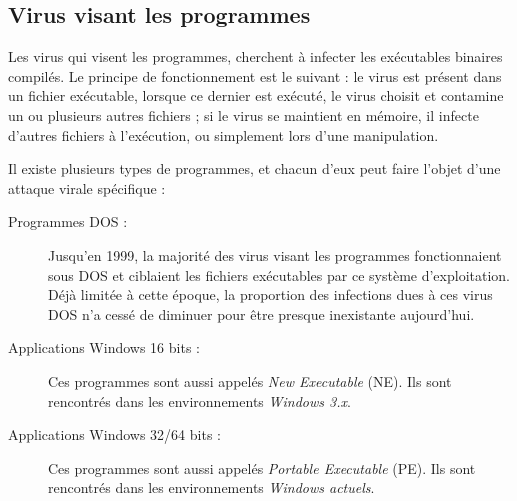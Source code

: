     \subsection{Virus visant les programmes}
    Les virus qui visent les programmes, cherchent à infecter les exécutables binaires compilés. 
    Le principe de fonctionnement est le suivant : le virus est présent dans un fichier exécutable, lorsque 
    ce dernier est exécuté, le virus choisit et contamine un ou plusieurs autres fichiers ; si le virus se maintient
    en mémoire, il infecte d'autres fichiers à l'exécution, ou simplement lors d'une manipulation. 
    \cite{virus_informatique_article}%

    Il existe plusieurs types de programmes, et chacun d'eux peut faire l'objet d'une attaque virale spécifique 
    \cite{virus_informatique_article} : %
    \begin{description}
        \item[Programmes DOS :] Jusqu’en 1999, la majorité des virus visant les programmes fonctionnaient sous 
            DOS et ciblaient les fichiers exécutables par ce système d'exploitation. 
            Déjà limitée à cette époque, la proportion des infections dues à ces virus DOS n’a cessé 
            de diminuer pour être presque inexistante aujourd’hui. %
        \item[Applications Windows 16 bits :] Ces programmes sont aussi appelés \emph{New Executable} (NE).
            Ils sont rencontrés dans les environnements \emph{Windows 3.x}. %

        \item[Applications Windows 32/64 bits :] Ces programmes sont aussi appelés \emph{Portable Executable}
            (PE). Ils sont rencontrés dans les environnements \emph{Windows actuels}.%

    \end{description}

